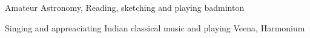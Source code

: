 
\begin{cventries}
\fontsize{9pt}{1em}\bodyfontlight\color{text}
  \begin{cvitems}
    \item Amateur Astronomy, Reading, sketching and playing badminton
    \item Singing and appreaciating Indian classical music and playing Veena, Harmonium
  \end{cvitems}
%   
\end{cventries}


